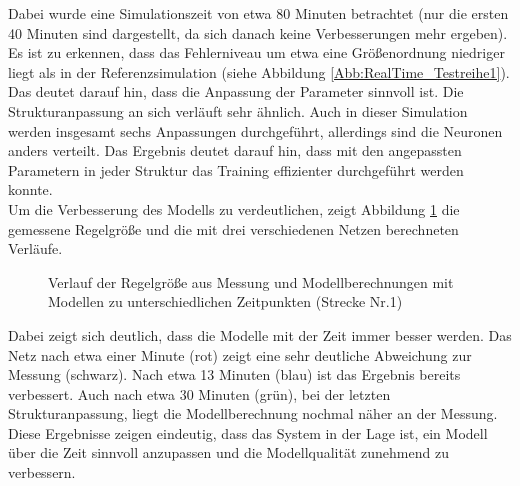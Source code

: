                 Dabei wurde eine Simulationszeit von etwa 80 Minuten betrachtet (nur die ersten 40 Minuten sind dargestellt, da sich danach keine Verbesserungen mehr ergeben). 
                Es ist zu erkennen, dass das Fehlerniveau um etwa eine Größenordnung niedriger liegt als in der 
                Referenzsimulation (siehe Abbildung \ref{Abb:RealTime_Testreihe1}). Das deutet darauf hin, dass die Anpassung der Parameter sinnvoll ist. Die Strukturanpassung an 
                sich verläuft sehr ähnlich. Auch in dieser Simulation werden insgesamt sechs Anpassungen durchgeführt, allerdings sind die Neuronen anders verteilt.
                Das Ergebnis deutet darauf hin, dass mit den angepassten Parametern in jeder Struktur das Training effizienter durchgeführt werden konnte.\\
                Um die Verbesserung des Modells zu verdeutlichen, zeigt Abbildung \ref{Abb:Modelle101} die gemessene Regelgröße und die mit drei verschiedenen Netzen berechneten Verläufe.
                \begin{figure}[h]
                    \caption{Verlauf der Regelgröße aus Messung und Modellberechnungen mit Modellen zu unterschiedlichen Zeitpunkten (Strecke Nr.1)}
                    \label{Abb:Modelle101}
                \end{figure}
                Dabei zeigt sich deutlich, dass die Modelle mit der Zeit immer besser werden. Das Netz nach etwa einer Minute (rot) zeigt eine sehr deutliche Abweichung zur Messung (schwarz).
                Nach etwa 13 Minuten (blau) ist das Ergebnis bereits verbessert. Auch nach etwa 30 Minuten (grün), bei der letzten Strukturanpassung, liegt die Modellberechnung
                nochmal näher an der Messung. Diese Ergebnisse zeigen eindeutig, dass das System in der Lage ist, ein Modell über die Zeit sinnvoll 
                anzupassen und die Modellqualität zunehmend zu verbessern.
                

